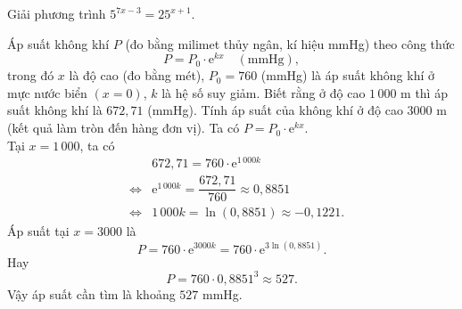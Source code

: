 \begin{bt}%
	Giải phương trình $5^{7x-3} = 25^{x+1}$.
\end{bt}

\begin{bt}%
	Áp suất không khí $P$ (đo bằng milimet thủy ngân, kí hiệu mmHg) theo công thức
	\[
	P = P_0 \cdot \mathrm{e}^{kx} \quad (\text{mmHg}),
	\]
	trong đó $x$ là độ cao (đo bằng mét), $P_0=760$ (mmHg) là áp suất không khí ở mực nước biển $(x=0)$, $k$ là hệ số suy giảm. Biết rằng ở độ cao $1\,000$ m thì áp suất không khí là $672{,}71$ (mmHg). Tính áp suất của không khí ở độ cao $3000$ m (kết quả làm tròn đến hàng đơn vị).
	\loigiai
	{
		Ta có $P = P_0 \cdot \mathrm{e}^{kx}$.\\
		Tại $x=1\,000$, ta có 
		\begin{eqnarray*}
			&&672{,}71 = 760\cdot \mathrm{e}^{1\,000k}\\
			&\Leftrightarrow&\mathrm{e}^{1\,000k} = \dfrac{672{,}71}{760} \approx 0{,}8851\\
			&\Leftrightarrow&1\,000k = \ln(0{,}8851) \approx -0{,}1221.
		\end{eqnarray*}
		Áp suất tại $x=3000$ là
		\[
		P = 760\cdot \mathrm{e}^{3000k}=760\cdot \mathrm{e}^{3\ln (0{,}8851)}.
		\]
		Hay
		\[
		P= 760\cdot 0{,}8851^3\approx 527.
		\]
		Vậy áp suất cần tìm là khoảng $527$ mmHg.
	}
\end{bt}

